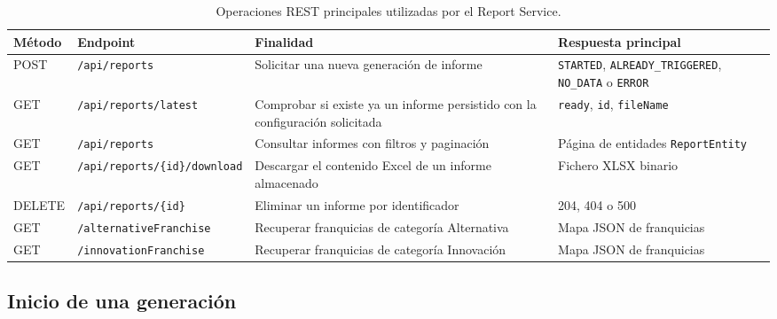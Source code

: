 \documentclass[11pt,a4paper,titlepage,oneside]{report}
\newcommand{\tfgtablestyle}{%
  \small
  \setlength{\tabcolsep}{4pt}%
  \renewcommand{\arraystretch}{1.15}%
  \rowcolors{2}{udcgray!08}{white}%
}
\begin{document}
\begin{table}[H]
  \centering
  \tfgtablestyle
  \caption{Operaciones REST principales utilizadas por el Report Service.}
  \label{tab:api-report-service}

  \begin{tabularx}{0.97\textwidth}
    {@{}p{}p{}X p{}@{}}

    \toprule
    \rowcolor{udcpink!20}

    \textbf{Método} &
    \textbf{Endpoint} &
    \textbf{Finalidad} &
    \textbf{Respuesta principal} \\

    \midrule

    POST &
    \texttt{/api/reports} &
    Solicitar una nueva generación de informe &
    \texttt{STARTED}, \texttt{ALREADY\_TRIGGERED},
    \texttt{NO\_DATA} o \texttt{ERROR} \\

    GET &
    \texttt{/api/reports/latest} &
    Comprobar si existe ya un informe persistido con la configuración
    solicitada &
    \texttt{ready}, \texttt{id}, \texttt{fileName} \\

    GET &
    \texttt{/api/reports} &
    Consultar informes con filtros y paginación &
    Página de entidades \texttt{ReportEntity} \\

    GET &
    \texttt{/api/reports/\{id\}/download} &
    Descargar el contenido Excel de un informe almacenado &
    Fichero XLSX binario \\

    DELETE &
    \texttt{/api/reports/\{id\}} &
    Eliminar un informe por identificador &
    204, 404 o 500 \\

    GET &
    \texttt{/alternativeFranchise} &
    Recuperar franquicias de categoría Alternativa &
    Mapa JSON de franquicias \\

    GET &
    \texttt{/innovationFranchise} &
    Recuperar franquicias de categoría Innovación &
    Mapa JSON de franquicias \\

    \bottomrule
  \end{tabularx}

\end{table}

\subsection{Inicio de una generación}
\end{document}
